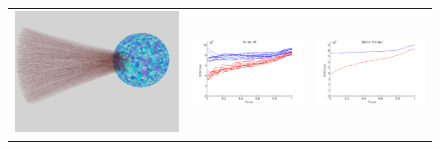 \documentclass[twocolumn]{article}
\begin{document}
\begin{figure}
\begin{tabular}{|c|c|c|}
\hline
\includegraphics[scale=.2]{sphere_demo.png}
&\includegraphics[scale=.35]{sphere_all.png}
&\includegraphics[scale=.35]{sphere_average.png}

\end{tabular}
\end{figure}
\end{document}
